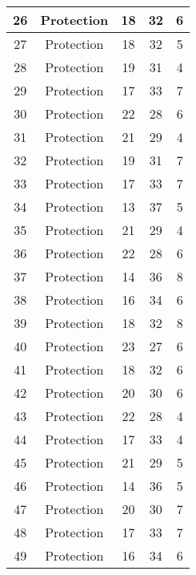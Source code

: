 \documentclass[results.tex]{subfiles}
\begin{document}
\begin{center}
\begin{tabular}{| c || c | c | c | c |}
    \hline
    26 & Protection & 18 & 32 & 6 \\ 
    \hline
    27 & Protection & 18 & 32 & 5 \\ 
    \hline
    28 & Protection & 19 & 31 & 4 \\ 
    \hline
    29 & Protection & 17 & 33 & 7 \\ 
    \hline
    30 & Protection & 22 & 28 & 6 \\ 
    \hline
    31 & Protection & 21 & 29 & 4 \\ 
    \hline
    32 & Protection & 19 & 31 & 7 \\ 
    \hline
    33 & Protection & 17 & 33 & 7 \\ 
    \hline
    34 & Protection & 13 & 37 & 5 \\ 
    \hline
    35 & Protection & 21 & 29 & 4 \\ 
    \hline
    36 & Protection & 22 & 28 & 6 \\ 
    \hline
    37 & Protection & 14 & 36 & 8 \\ 
    \hline
    38 & Protection & 16 & 34 & 6 \\ 
    \hline
    39 & Protection & 18 & 32 & 8 \\ 
    \hline
    40 & Protection & 23 & 27 & 6 \\ 
    \hline
    41 & Protection & 18 & 32 & 6 \\ 
    \hline
    42 & Protection & 20 & 30 & 6 \\ 
    \hline
    43 & Protection & 22 & 28 & 4 \\ 
    \hline
    44 & Protection & 17 & 33 & 4 \\ 
    \hline
    45 & Protection & 21 & 29 & 5 \\ 
    \hline
    46 & Protection & 14 & 36 & 5 \\ 
    \hline
    47 & Protection & 20 & 30 & 7 \\ 
    \hline
    48 & Protection & 17 & 33 & 7 \\ 
    \hline
    49 & Protection & 16 & 34 & 6 \\ 
    \hline   \end{tabular}
\end{center}
\end{document}
